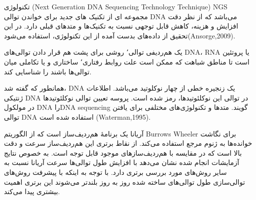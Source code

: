 
تکنولوژی (Next Generation DNA Sequencing Technology Technique) NGS مجموعه ای از تکنیک های جدید برای خواندن توالی DNA  می‌باشد که از نظر دقت  افزایش و هزینه، کاهش قابل توجهی نسبت به تکنیک‌ها و متدهای قبلی دارد. در این تحقیق از داده‌های بدست آمده از این تکنولوژی، استفاده می‌شود(Ansorge,2009).


یک هم‌ردیفی توالی٬ روشی برای پشت هم قرار دادن توالی‌های DNA، RNA یا پروتئین است تا مناطق شباهت که ممکن است علت روابط رفتاری٬ ساختاری و یا تکاملی میان توالی‌ها باشند را شناسایی کند.


همانطور که گفته شد، DNA یک زنجیره خطی از چهار نوکلوتید می‌باشد. اطلاعات ژنتیکی DNA در توالی این نوکلئوتیدها، رمز شده است. پروسه تعیین توالی نوکلئوتید‌ها در مولکول DNA راDNA sequencing  گویند. متدها و تکنولوژی‌های مختلفی برای یافتن توالی DNA استفاده شده است (Waterman,1995).


آریانا یک برنامهٔ هم‌ردیف‌ساز است که از الگوریتم Burrows Wheeler برای نگاشت خوانده‌ها به ژنوم مرجع استفاده می‌کند. از نقاط برتری این هم‌ردیف‌ساز سرعت و دقت بالا است که در مقایسه با هم‌ردیف‌سازهای موجود قابل توجه است. به خصوص نتایج آزمایشات انجام شده نشان می‌دهد با افزایش طول توالی‌ها سرعت آریانا نسبت به سایر روش‌های مورد بررسی برتری دارد. با توجه به اینکه با پیشرفت روش‌های توالی‌سازی طول توالی‌های ساخته شده روز به روز بلندتر می‌شوند این برتری اهمیت بیشتری پیدا می‌کند.




